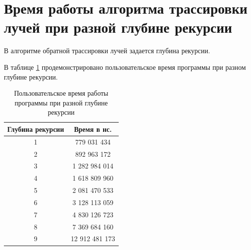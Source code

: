 \begin{figure}[ht!]
\end{figure}

\section{Время работы алгоритма трассировки лучей при разной глубине рекурсии}

В алгоритме обратной трассировки лучей задается глубина рекурсии.

В таблице \ref{tab:time1} продемонстрировано пользовательское время программы при разном глубине рекурсии.

\begin{table}[ht!]
	\begin{center}
		
		\caption{Пользовательское время работы программы при разной глубине рекурсии}
		\label{tab:time1}
		\begin{tabular}{|c|c|}
			\hline
			Глубина рекурсии & Время в 	нс. \\
			\hline
			1  & 779 031 434 \\
			\hline
			2  & 892 963 172 \\
			\hline
			3  & 1 282 984 014 \\
			\hline
			4  & 1 618 809 960 \\
			\hline
			5  & 2 081 470 533 \\
			\hline
			6  & 3 128 113 059 \\
			\hline
			7  & 4 830 126 723 \\
			\hline
			8  & 7 369 684 160 \\
			\hline
			9  & 12 912 481 173 \\
			\hline
			
		\end{tabular}
	\end{center}
\end{table}